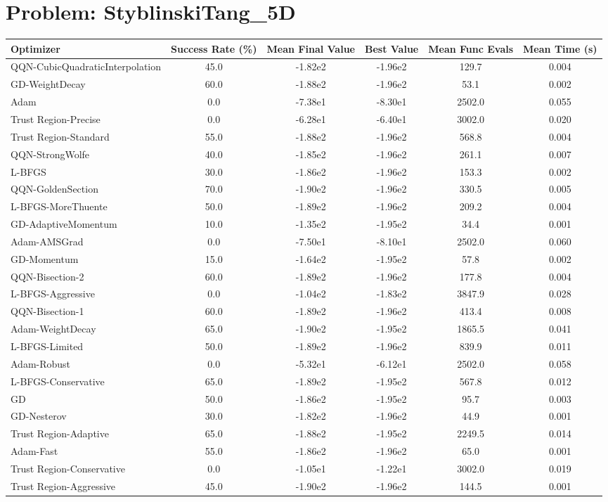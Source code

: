 \documentclass{article}
\begin{document}
\section{Problem: StyblinskiTang\_5D}
\begin{longtable}{p{3cm}*{5}{c}}
\toprule
\textbf{Optimizer} & \textbf{Success Rate (\%)} & \textbf{Mean Final Value} & \textbf{Best Value} & \textbf{Mean Func Evals} & \textbf{Mean Time (s)} \\
\midrule
QQN-CubicQuadraticInterpolation & 45.0 & -1.82e2 & -1.96e2 & 129.7 & 0.004 \\
GD-WeightDecay & 60.0 & -1.88e2 & -1.96e2 & 53.1 & 0.002 \\
Adam & 0.0 & -7.38e1 & -8.30e1 & 2502.0 & 0.055 \\
Trust Region-Precise & 0.0 & -6.28e1 & -6.40e1 & 3002.0 & 0.020 \\
Trust Region-Standard & 55.0 & -1.88e2 & -1.96e2 & 568.8 & 0.004 \\
QQN-StrongWolfe & 40.0 & -1.85e2 & -1.96e2 & 261.1 & 0.007 \\
L-BFGS & 30.0 & -1.86e2 & -1.96e2 & 153.3 & 0.002 \\
QQN-GoldenSection & 70.0 & -1.90e2 & -1.96e2 & 330.5 & 0.005 \\
L-BFGS-MoreThuente & 50.0 & -1.89e2 & -1.96e2 & 209.2 & 0.004 \\
GD-AdaptiveMomentum & 10.0 & -1.35e2 & -1.95e2 & 34.4 & 0.001 \\
Adam-AMSGrad & 0.0 & -7.50e1 & -8.10e1 & 2502.0 & 0.060 \\
GD-Momentum & 15.0 & -1.64e2 & -1.95e2 & 57.8 & 0.002 \\
QQN-Bisection-2 & 60.0 & -1.89e2 & -1.96e2 & 177.8 & 0.004 \\
L-BFGS-Aggressive & 0.0 & -1.04e2 & -1.83e2 & 3847.9 & 0.028 \\
QQN-Bisection-1 & 60.0 & -1.89e2 & -1.96e2 & 413.4 & 0.008 \\
Adam-WeightDecay & 65.0 & -1.90e2 & -1.95e2 & 1865.5 & 0.041 \\
L-BFGS-Limited & 50.0 & -1.89e2 & -1.96e2 & 839.9 & 0.011 \\
Adam-Robust & 0.0 & -5.32e1 & -6.12e1 & 2502.0 & 0.058 \\
L-BFGS-Conservative & 65.0 & -1.89e2 & -1.95e2 & 567.8 & 0.012 \\
GD & 50.0 & -1.86e2 & -1.95e2 & 95.7 & 0.003 \\
GD-Nesterov & 30.0 & -1.82e2 & -1.96e2 & 44.9 & 0.001 \\
Trust Region-Adaptive & 65.0 & -1.88e2 & -1.95e2 & 2249.5 & 0.014 \\
Adam-Fast & 55.0 & -1.86e2 & -1.96e2 & 65.0 & 0.001 \\
Trust Region-Conservative & 0.0 & -1.05e1 & -1.22e1 & 3002.0 & 0.019 \\
Trust Region-Aggressive & 45.0 & -1.90e2 & -1.96e2 & 144.5 & 0.001 \\
\bottomrule
\end{longtable}
\end{document}
